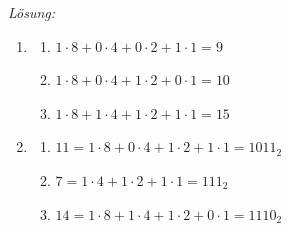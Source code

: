\documentclass[ngerman, 11pt]{scrreprt}
\begin{document}
	\bigskip
	\emph{Lösung:}
	
	\begin{enumerate}[label=\alph*),itemsep=0mm, parsep=0mm]
		\item 
		\begin{multicols}{3}
			\begin{enumerate}[label=(\arabic*)]
				\item $1\cdot 8+0 \cdot 4 + 0\cdot 2+1\cdot 1= 9$
				\item $1\cdot 8+0 \cdot 4 + 1\cdot 2+0\cdot 1= 10$
				\item $1\cdot 8+1 \cdot 4 + 1\cdot 2+1\cdot 1= 15$
			\end{enumerate}
		\end{multicols}
		\item 		
			\begin{enumerate}[label=(\arabic*)]
				\item $11=1\cdot 8 + 0\cdot 4 + 1\cdot 2+1\cdot 1 = 1011_2$
				\item $7=1\cdot 4 + 1\cdot 2 + 1\cdot 1 = 111_2$
				\item $14=1\cdot 8+ 1\cdot 4+ 1\cdot 2 + 0\cdot 1 = 1110_2$
			\end{enumerate}
	\end{enumerate}
	
\end{document}
